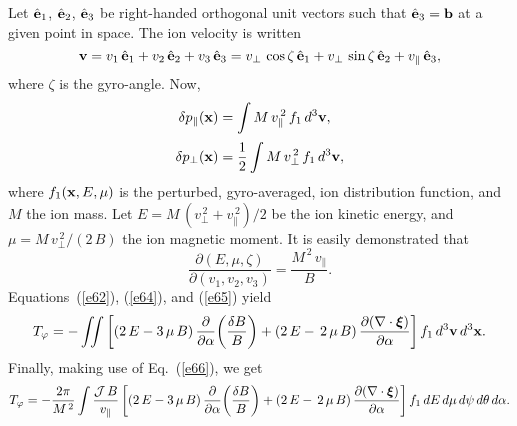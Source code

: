 \documentclass[12pt,prb,aps,notitlepage]{revtex4-1}
\newcommand{\bxi}{\mbox{\boldmath$\xi$}}
\begin{document}
 Let $\hat{\bf e}_1$, $\hat{\bf e}_2$, $\hat{\bf e}_3$ be right-handed orthogonal unit vectors such that $\hat{\bf e}_3={\bf b}$ at a given
 point in space. The ion velocity is written
 \begin{equation}
 {\bf v} = v_1\,\hat{\bf e}_1 + v_2\,\hat{\bf e}_2+v_3\,\hat{\bf e}_3= v_\perp\,\cos\zeta\,\hat{\bf e}_1+ v_\perp\,\sin\zeta\,\hat{\bf e}_2+ 
 v_\parallel\,\hat{\bf e}_3,
 \end{equation}
 where $\zeta$ is the gyro-angle. 
 Now, 
 \begin{align}\label{e64}
 \delta p_\parallel({\bf x}) &= \int M\,v_\parallel^{\,2}\,f_1\,d^3{\bf v},\\[0.5ex]
 \delta p_\perp({\bf x}) &= \frac{1}{2}\int M\,v_\perp^{\,2}\,f_1\,d^3{\bf v},\label{e65}
 \end{align}
 where $f_1({\bf x},E,\mu)$ is the perturbed, gyro-averaged, ion distribution function, and $M$  the ion mass. Let
 $E=M\,(v_\perp^{\,2}+v_\parallel^{\,2})/2$ be the ion kinetic energy,  and $\mu=M\,v_\perp^{\,2}/(2\,B)$ the ion magnetic moment. 
 It is easily demonstrated that
 \begin{equation}\label{e66}
 \frac{\partial (E,\mu,\zeta)}{\partial(v_1,v_2,v_3)} = \frac{M^{\,2}\,v_\parallel}{B}.
 \end{equation}
 Equations~(\ref{e62}), (\ref{e64}), and (\ref{e65}) yield
 \begin{equation}
 T_\varphi =-\int\!\!\!\int \left[(2\,E-3\,\mu\,B)\,\frac{\partial}{\partial\alpha}\!\left(\frac{\delta B}{B}\right) + (2\,E-\,2\,\mu\,B)\,\frac{\partial(\nabla\cdot\bxi)}{\partial\alpha}\right]f_1\,d^3{\bf v}\,d^3{\bf x}.
 \end{equation}
 Finally, making use of Eq.~(\ref{e66}), we get
 \begin{equation}\label{e92x}
 T_\varphi = -\frac{2\pi}{M^{\,2}}\int \frac{{\cal J}\,B}{v_\parallel}\left[(2\,E-3\,\mu\,B)\,\frac{\partial}{\partial\alpha}\!\left(\frac{\delta B}{B}\right) + (2\,E-\,2\,\mu\,B)\,\frac{\partial(\nabla\cdot\bxi)}{\partial\alpha}\right]f_1\,dE\,d\mu\,d\psi\,d\theta\,d\alpha.
 \end{equation}
 
\end{document}
